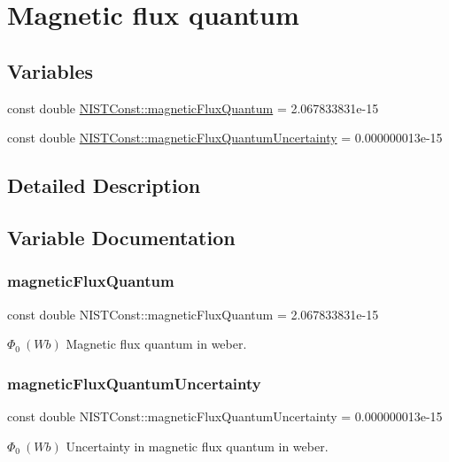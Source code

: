 \hypertarget{group___magnetic_flux_quantum}{}\section{Magnetic flux quantum}
\label{group___magnetic_flux_quantum}
\subsection*{Variables}
\begin{DoxyCompactItemize}
\item 
const double \hyperlink{group___magnetic_flux_quantum_ga2ed9e5fb19a6f2cc0c25ad945ea6b562}{N\+I\+S\+T\+Const\+::magnetic\+Flux\+Quantum} = 2.\+067833831e-\/15
\item 
const double \hyperlink{group___magnetic_flux_quantum_gabb501bffb2a565762d9f4bde15f859b6}{N\+I\+S\+T\+Const\+::magnetic\+Flux\+Quantum\+Uncertainty} = 0.\+000000013e-\/15
\end{DoxyCompactItemize}


\subsection{Detailed Description}


\subsection{Variable Documentation}
\mbox{\label{group___magnetic_flux_quantum_ga2ed9e5fb19a6f2cc0c25ad945ea6b562}} 
\subsubsection{\texorpdfstring{magnetic\+Flux\+Quantum}{magneticFluxQuantum}}
{\footnotesize\ttfamily const double N\+I\+S\+T\+Const\+::magnetic\+Flux\+Quantum = 2.\+067833831e-\/15}

$\Phi_0 \ (Wb)$ Magnetic flux quantum in weber. \mbox{\label{group___magnetic_flux_quantum_gabb501bffb2a565762d9f4bde15f859b6}} 
\subsubsection{\texorpdfstring{magnetic\+Flux\+Quantum\+Uncertainty}{magneticFluxQuantumUncertainty}}
{\footnotesize\ttfamily const double N\+I\+S\+T\+Const\+::magnetic\+Flux\+Quantum\+Uncertainty = 0.\+000000013e-\/15}

$\Phi_0 \ (Wb)$ Uncertainty in magnetic flux quantum in weber. 